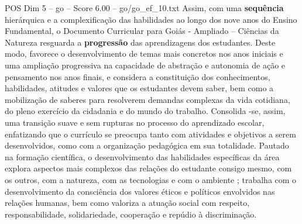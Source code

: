 \begin{textsample}{POS Dim 5 – go – Score 6.00 – go/go\_ef\_10.txt}
Assim, com uma \textbf{sequência} hierárquica e a complexificação das habilidades ao longo dos nove anos do Ensino Fundamental, o Documento Curricular para Goiás - Ampliado – Ciências da Natureza resguarda a \textbf{progressão} das aprendizagens dos estudantes.
Deste modo, favorece o desenvolvimento de temas mais concretos nos anos iniciais e uma ampliação progressiva na capacidade de abstração e autonomia de ação e pensamento nos anos finais, e considera a constituição dos conhecimentos, habilidades, atitudes e valores que os estudantes devem saber, bem como a mobilização de saberes para resolverem demandas complexas da vida cotidiana, do pleno exercício da cidadania e do mundo do trabalho.
Consolida -se, assim, uma transição suave e sem rupturas no processo do aprendizado escolar, enfatizando que o currículo se preocupa tanto com atividades e objetivos a serem desenvolvidos, como com a organização pedagógica em sua totalidade.
Pautado na formação científica, o desenvolvimento das habilidades específicas da área explora aspectos mais complexos das relações do estudante consigo mesmo, com os outros, com a natureza, com as tecnologias e com o ambiente ; trabalha com o desenvolvimento da consciência dos valores éticos e políticos envolvidos nas relações humanas, bem como valoriza a atuação social com respeito, responsabilidade, solidariedade, cooperação e repúdio à discriminação.

\end{textsample}
